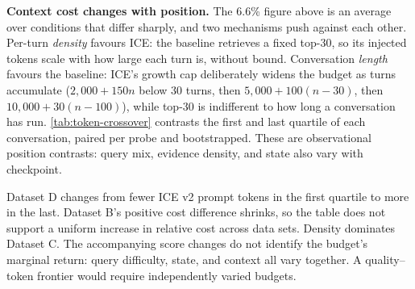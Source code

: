 \documentclass[twoside,11pt]{article}
\begin{document}
\textbf{Context cost changes with position.} The 6.6\% figure above is an average over conditions that differ sharply, and two mechanisms push against each other. Per-turn \emph{density} favours ICE: the baseline retrieves a fixed top-30, so its injected tokens scale with how large each turn is, without bound. Conversation \emph{length} favours the baseline: ICE's growth cap deliberately widens the budget as turns accumulate ($2{,}000 + 150n$ below 30 turns, then $5{,}000 + 100(n-30)$, then $10{,}000 + 30(n-100)$), while top-30 is indifferent to how long a conversation has run. \cref{tab:token-crossover} contrasts the first and last quartile of each conversation, paired per probe and bootstrapped. These are observational position contrasts: query mix, evidence density, and state also vary with checkpoint.

Dataset D changes from fewer ICE v2 prompt tokens in the first quartile to more in the last. Dataset B's positive cost difference shrinks, so the table does not support a uniform increase in relative cost across data sets. Density dominates Dataset C. The accompanying score changes do not identify the budget's marginal return: query difficulty, state, and context all vary together. A quality--token frontier would require independently varied budgets.
\end{document}
